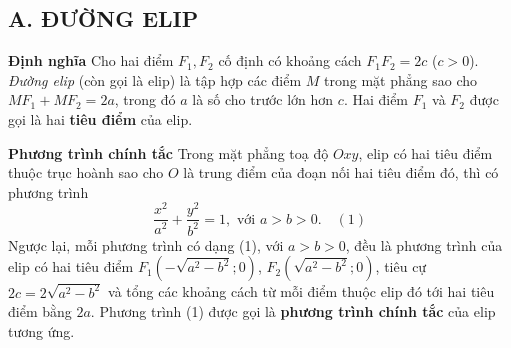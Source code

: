 \documentclass[12pt,a4paper]{extarticle}
\begin{document}
\subsection*{A. ĐƯỜNG ELIP}
\textbf{Định nghĩa}
Cho hai điểm $F_1, F_2$ cố định có khoảng cách $F_1F_2 = 2c$ ($c > 0$).\\
\vspace{0.5cm}
\textit{Đường elip} (còn gọi là elip) là tập hợp các điểm $M$ trong mặt phẳng sao cho $MF_1 + MF_2 = 2a$, trong đó $a$ là số cho trước lớn hơn $c$. Hai điểm $F_1$ và $F_2$ được gọi là hai \textbf{tiêu điểm} của elip.
\begin{center}
\end{center}
\textbf{Phương trình chính tắc}
Trong mặt phẳng toạ độ $Oxy$, elip có hai tiêu điểm thuộc trục hoành sao cho $O$ là trung điểm của đoạn nối hai tiêu điểm đó, thì có phương trình
\[ \frac{x^2}{a^2} + \frac{y^2}{b^2} = 1, \text{ với } a > b > 0. \quad (1) \]
Ngược lại, mỗi phương trình có dạng (1), với $a > b > 0$, đều là phương trình của elip có hai tiêu điểm $F_1(-\sqrt{a^2 - b^2}; 0)$, $F_2(\sqrt{a^2 - b^2}; 0)$, tiêu cự $2c = 2\sqrt{a^2 - b^2}$ và tổng các khoảng cách từ mỗi điểm thuộc elip đó tới hai tiêu điểm bằng $2a$.
Phương trình (1) được gọi là \textbf{phương trình chính tắc} của elip tương ứng.
\vspace{0.5cm}
\end{document}
